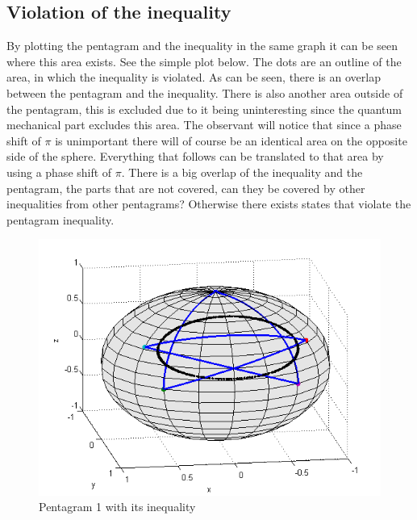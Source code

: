 \documentclass[
  utf8,%
  parskip,%
  largesmallcaps,intlimits,widermath,%
  sharecounter,nobreak,definition=marks,%
  noparts%
]{rtthesis}
\begin{document}
\subsection{Violation of the inequality}\label{subsec:Violation of the inequalit}
By plotting the pentagram and the inequality in the same graph it can be seen where this area exists. See the simple plot below.
The dots are an outline of the area, in which the inequality is violated. As can be seen, there is an overlap between the pentagram and the inequality. There is also another area outside of the pentagram, this is excluded due to it being uninteresting since the quantum mechanical part excludes this area.
The observant will notice that since a phase shift of $\pi$ is unimportant there will of course be an identical area on the opposite side of the sphere. Everything that follows can be translated to that area by using a phase shift of $\pi$. There is a big overlap of the inequality and the pentagram, the parts that are not covered, can they be covered by other inequalities from other pentagrams? Otherwise there exists states that violate the pentagram inequality.
\begin{figure}[H]
\begin{center}
\includegraphics[scale=0.5]{sphere1ine.png}
\caption{Pentagram 1 with its inequality}
\end{center}
\end{figure}
\newpage
\end{document}
